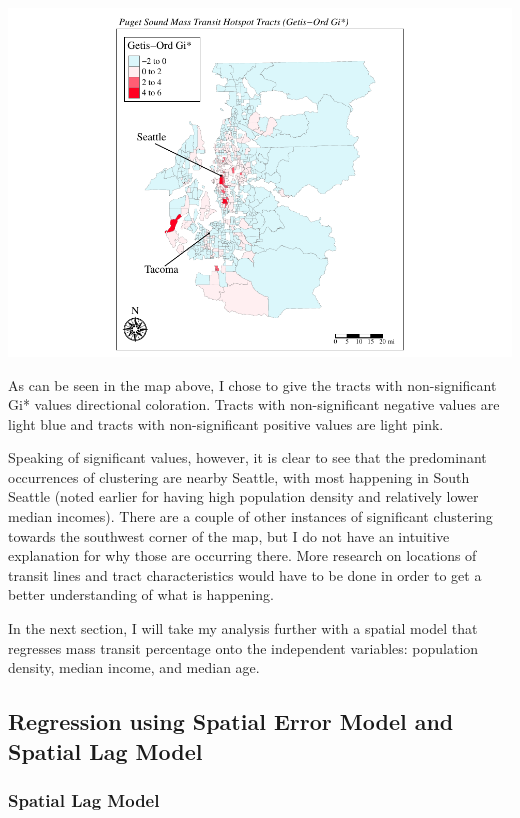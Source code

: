 \documentclass[
]{article}
\begin{document}
\includegraphics{truncated_transit_hotspots_paper_files/figure-latex/unnamed-chunk-7-1.pdf}

As can be seen in the map above, I chose to give the tracts with
non-significant Gi* values directional coloration. Tracts with
non-significant negative values are light blue and tracts with
non-significant positive values are light pink.

Speaking of significant values, however, it is clear to see that the
predominant occurrences of clustering are nearby Seattle, with most
happening in South Seattle (noted earlier for having high population
density and relatively lower median incomes). There are a couple of
other instances of significant clustering towards the southwest corner
of the map, but I do not have an intuitive explanation for why those are
occurring there. More research on locations of transit lines and tract
characteristics would have to be done in order to get a better
understanding of what is happening.

In the next section, I will take my analysis further with a spatial
model that regresses mass transit percentage onto the independent
variables: population density, median income, and median age.

\subsection{Regression using Spatial Error Model and Spatial Lag
Model}\label{regression-using-spatial-error-model-and-spatial-lag-model}

\subsubsection{Spatial Lag Model}\label{spatial-lag-model}
\end{document}
